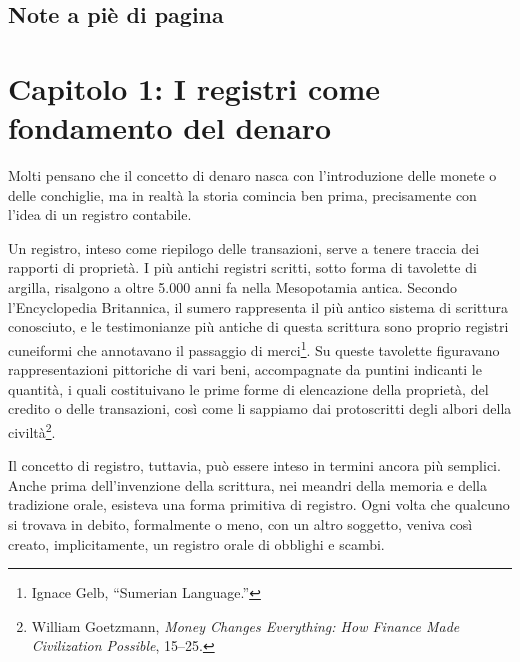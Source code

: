 \documentclass[
  a5paper,
  smalldemyvopaper,10pt,twoside,onecolumn,openright,extrafontsizes,hidelinks]{memoir}
\begin{document}
\section{Note a piè di pagina}\label{note-a-piuxe8-di-pagina-2}


\chapter{Capitolo 1: I registri come fondamento del
denaro}\label{capitolo-1-i-registri-come-fondamento-del-denaro-1}

Molti pensano che il concetto di denaro nasca con l'introduzione delle
monete o delle conchiglie, ma in realtà la storia comincia ben prima,
precisamente con l'idea di un registro contabile.

Un registro, inteso come riepilogo delle transazioni, serve a tenere
traccia dei rapporti di proprietà. I più antichi registri scritti, sotto
forma di tavolette di argilla, risalgono a oltre 5.000 anni fa nella
Mesopotamia antica. Secondo l'Encyclopedia Britannica, il sumero
rappresenta il più antico sistema di scrittura conosciuto, e le
testimonianze più antiche di questa scrittura sono proprio registri
cuneiformi che annotavano il passaggio di merci\footnote{Ignace Gelb,
  ``Sumerian Language.''}. Su queste tavolette figuravano
rappresentazioni pittoriche di vari beni, accompagnate da puntini
indicanti le quantità, i quali costituivano le prime forme di
elencazione della proprietà, del credito o delle transazioni, così come
li sappiamo dai protoscritti degli albori della civiltà\footnote{William
  Goetzmann, \emph{Money Changes Everything: How Finance Made
  Civilization Possible}, 15--25.}.

Il concetto di registro, tuttavia, può essere inteso in termini ancora
più semplici. Anche prima dell'invenzione della scrittura, nei meandri
della memoria e della tradizione orale, esisteva una forma primitiva di
registro. Ogni volta che qualcuno si trovava in debito, formalmente o
meno, con un altro soggetto, veniva così creato, implicitamente, un
registro orale di obblighi e scambi.
\end{document}
